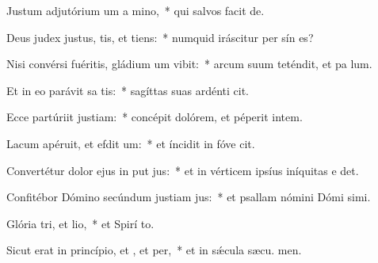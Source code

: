 \item Justum adjutórium um a mino,~* qui salvos facit  de.
\item Deus judex justus, tis, et tiens:~* numquid iráscitur per sín es?
\item Nisi convérsi fuéritis, gládium um vibit:~* arcum suum teténdit, et pa lum.
\item Et in eo parávit sa tis:~* sagíttas suas ardénti cit.
\item Ecce partúriit justiam:~* concépit dolórem, et péperit intem.
\item Lacum apéruit, et efdit um:~* et íncidit in fóve  cit.
\item Convertétur dolor ejus in put jus:~* et in vérticem ipsíus iníquitas e det.
\item Confitébor Dómino secúndum justiam jus:~* et psallam nómini Dómi simi.
\item Glória tri, et lio,~* et Spirí to.
\item Sicut erat in princípio, et , et per,~* et in sǽcula sæcu. men.

